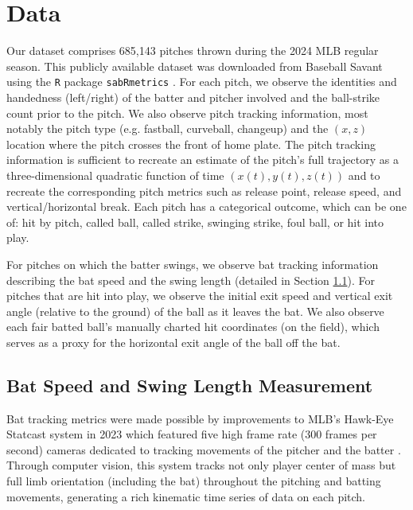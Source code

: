 \documentclass{article}
\begin{document}
  \section{Data}
  \label{sec:data}

    Our dataset comprises 685,143 pitches thrown during the 2024 MLB regular season. This publicly available dataset was downloaded from Baseball Savant \citep{baseball_savant} using the \texttt{R} package \texttt{sabRmetrics} \citep{sabRmetrics}. For each pitch, we observe the identities and handedness (left/right) of the batter and pitcher involved and the ball-strike count prior to the pitch. We also observe pitch tracking information, most notably the pitch type (e.g. fastball, curveball, changeup) and the $(x, z)$ location where the pitch crosses the front of home plate. The pitch tracking information is sufficient to recreate an estimate of the pitch's full trajectory as a three-dimensional quadratic function of time $(x(t), y(t), z(t))$ and to recreate the corresponding pitch metrics such as release point, release speed, and vertical/horizontal break. Each pitch has a categorical outcome, which can be one of: hit by pitch, called ball, called strike, swinging strike, foul ball, or hit into play.

    For pitches on which the batter swings, we observe bat tracking information describing the bat speed and the swing length (detailed in Section \ref{sec:measurement}). For pitches that are hit into play, we observe the initial exit speed and vertical exit angle (relative to the ground) of the ball as it leaves the bat. We also observe each fair batted ball's manually charted hit coordinates (on the field), which serves as a proxy for the horizontal exit angle of the ball off the bat.

    \subsection{Bat Speed and Swing Length Measurement}
    \label{sec:measurement}

      Bat tracking metrics were made possible by improvements to MLB's Hawk-Eye Statcast system in 2023 which featured five high frame rate (300 frames per second) cameras dedicated to tracking movements of the pitcher and the batter \citep{goldbeck_introducing_2023}. Through computer vision, this system tracks not only player center of mass but full limb orientation (including the bat) throughout the pitching and batting movements, generating a rich kinematic time series of data on each pitch.
\end{document}
